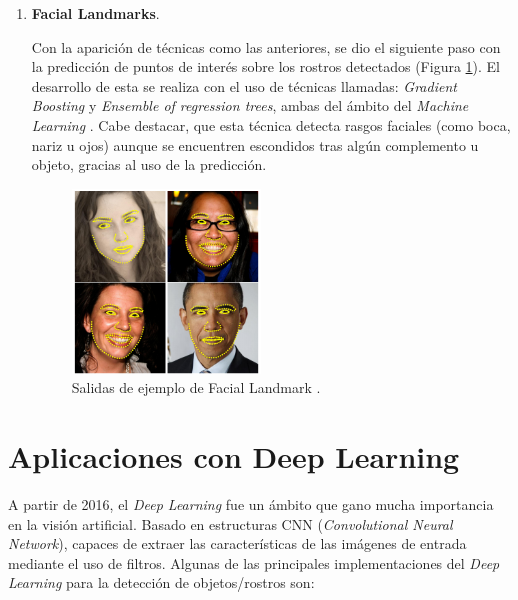 \begin{enumerate}
	\item \textbf{Facial Landmarks}.
	
	Con la aparición de técnicas como las anteriores, se dio el siguiente paso con la predicción de puntos de interés sobre los rostros detectados (Figura \ref{fig:landmarkExample}). El desarrollo de esta se realiza con el uso de técnicas llamadas: \textit{Gradient Boosting} y \textit{Ensemble of regression trees}, ambas del ámbito del \textit{Machine Learning} \cite{faceLandmark}. Cabe destacar, que esta técnica detecta rasgos faciales (como boca, nariz u ojos) aunque se encuentren escondidos tras algún complemento u objeto, gracias al uso de la predicción.
	
	\begin{figure}[htp]
		\centering
		\includegraphics[width=5cm]{imagenes/landmark_example.png}
		\caption{Salidas de ejemplo de Facial Landmark \cite{faceLandmark}.}
		\label{fig:landmarkExample}
	\end{figure}
	
\end{enumerate}


\section{Aplicaciones con Deep Learning}

A partir de 2016, el \textit{Deep Learning} fue un ámbito que gano mucha importancia en la visión artificial. Basado en estructuras CNN (\textit{Convolutional Neural Network}), capaces de extraer las características de las imágenes de entrada mediante el uso de filtros. Algunas de las principales implementaciones del \textit{Deep Learning} para la detección de objetos/rostros son:

